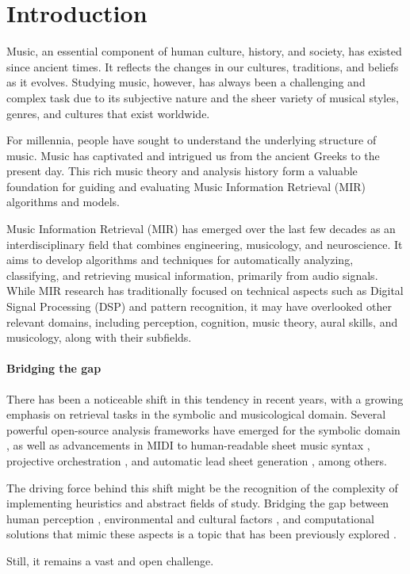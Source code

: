 \chapter{Introduction}

Music, an essential component of human culture, history, and society, has existed since ancient times. It reflects the changes in our cultures, traditions, and beliefs as it evolves. Studying music, however, has always been a challenging and complex task due to its subjective nature and the sheer variety of musical styles, genres, and cultures that exist worldwide.

For millennia, people have sought to understand the underlying structure of music. Music has captivated and intrigued us from the ancient Greeks to the present day. This rich music theory and analysis history form a valuable foundation for guiding and evaluating Music Information Retrieval (MIR) algorithms and models.

Music Information Retrieval (MIR) has emerged over the last few decades as an interdisciplinary field that combines engineering, musicology, and neuroscience. It aims to develop algorithms and techniques for automatically analyzing, classifying, and retrieving musical information, primarily from audio signals. While MIR research has traditionally focused on technical aspects such as Digital Signal Processing (DSP) and pattern recognition, it may have overlooked other relevant domains, including perception, cognition, music theory, aural skills, and musicology, along with their subfields.

\subsubsection{Bridging the gap}

There has been a noticeable shift in this tendency in recent years, with a growing emphasis on retrieval tasks in the symbolic and musicological domain. Several powerful open-source analysis frameworks have emerged for the symbolic domain \cite{ScottCuthbertChristopherArizaMusic21:Data}, as well as advancements in MIDI to human-readable sheet music syntax \cite{Suzuki2021ScoreRepresentation}, projective orchestration \cite{Crestel2018AOrchestration}, and automatic lead sheet generation \cite{WeilAutomaticSignals}, among others.

The driving force behind this shift might be the recognition of the complexity of implementing heuristics and abstract fields of study. Bridging the gap between human perception \cite{Large1994ResonanceMeter}\cite{Thaut2014HumanPatter}, environmental and cultural factors \cite{Sears2014PerceivingCadence}, and computational solutions that mimic these aspects \cite{Mullensiefen2003MeasuringJudgments} is a topic that has been previously explored \cite{Hernandez-Olivan2023SymbolicMethods}. 

Still, it remains a vast and open challenge.